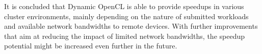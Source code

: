 It is concluded that Dynamic OpenCL is able to provide speedups in various cluster environments, mainly depending on the nature of submitted workloads and available network bandwidths to remote devices. With further improvements that aim at reducing the impact of limited network bandwidths, the speedup potential might be increased even further in the future.


